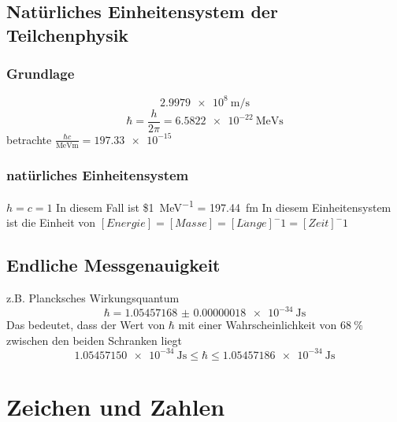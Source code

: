 \documentclass[a4paper]{scrartcl}
\begin{document}
\subsection{Natürliches Einheitensystem der Teilchenphysik}
\label{sec-1-4}
\subsubsection{Grundlage}
\label{sec-1-4-1}
\[\SI{2.9979e8}{\meter\per\second}\]
\[\si{\planckbar} = \frac{h}{2\pi} = \SI{6.5822e-22}{\MeV\second}\]
betrachte $\frac{\si{\planckbar} c}{\si{\MeV\meter}}=\num{197.33e-15}$
\subsubsection{natürliches Einheitensystem}
\label{sec-1-4-2}
$h = c = 1$
In diesem Fall ist \$\si{1\per\mega\electronvolt} = \SI{197.44}{\femto\meter}
In diesem Einheitensystem ist die Einheit von $[Energie] = [Masse] = [L\ddot{a}nge]^-1 = [Zeit]^-1$

\subsection{Endliche Messgenauigkeit}
\label{sec-1-5}
z.B. Plancksches Wirkungsquantum
\[\si{\planckbar} = \SI{1.05457168(18)e-34}{\joule\second}\]
Das bedeutet, dass der Wert von $\si{\planckbar}$ mit einer Wahrscheinlichkeit von $\SI{68}{\percent}$ zwischen den beiden Schranken liegt \[\SI{1.05457150e-34}{\joule\second} \leq \si{\planckbar} \leq \SI{1.05457186e-34}{\joule\second}\]

\section{Zeichen und Zahlen}
\label{sec-2}
\end{document}

